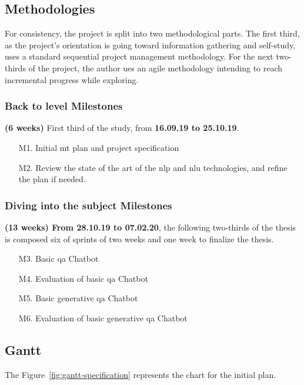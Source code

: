 \subsection*{Methodologies}
For consistency, the project is split into two methodological parts. The first third, as the project's orientation is going toward information gathering and self-study, uses a standard sequential project management methodology. For the next two-thirds of the project, the author ues an agile methodology intending to reach incremental progress while exploring.

\subsubsection*{Back to level Milestones}
\textbf{(6 weeks)} First third of the study, from \textbf{16.09.19 to 25.10.19}.
\begin{enumerate}
    \setlength\itemsep{0em}
    \item[M1.] Initial \gls{mt} plan and project specification
    \item[M2.] Review the state of the art of the \gls{nlp} and \gls{nlu} technologies, and refine the plan if needed.
\end{enumerate}


\subsubsection*{Diving into the subject Milestones}
\textbf{(13 weeks) From 28.10.19 to 07.02.20}, the following two-thirds of the thesis is composed six of sprints of two weeks and one week to finalize the thesis.
\begin{itemize}
    \setlength\itemsep{0em}
    \item[M3.] Basic \gls{qa} Chatbot
    \item[M4.] Evaluation of basic \gls{qa} Chatbot
    \item[M5.] Basic generative \gls{qa} Chatbot
    \item[M6.] Evaluation of basic generative \gls{qa} Chatbot
\end{itemize}

\subsection*{Gantt}
The Figure~\ref{fig:gantt-specification} represents the chart for the initial plan.


